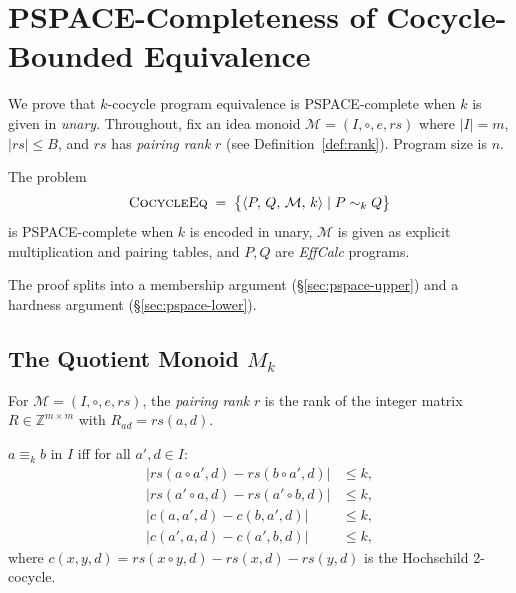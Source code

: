 
\section{PSPACE-Completeness of Cocycle-Bounded Equivalence}
\label{sec:pspace}

We prove that $k$-cocycle program equivalence is
\textsc{PSPACE}-complete when $k$ is given in \emph{unary}.
Throughout, fix an idea monoid $\mathcal{M}=(I,{\circ},e,\mathit{rs})$
where $|I|=m$, $|\mathit{rs}|\le B$, and $\mathit{rs}$ has
\emph{pairing rank} $r$ (see Definition~\ref{def:rank}).
Program size is $n$.

\begin{theorem}
\label{thm:pspace-main}
The problem
\[
  \textsc{CocycleEq} \;=\;
  \bigl\{\langle P,\,Q,\,\mathcal{M},\,k\rangle
        \mid P \sim_k Q\bigr\}
\]
is \textsc{PSPACE}-complete when $k$ is encoded in unary,
$\mathcal{M}$ is given as explicit multiplication and pairing tables,
and $P,Q$ are \emph{EffCalc} programs.
\end{theorem}

\noindent
The proof splits into a membership argument
(\S\ref{sec:pspace-upper}) and a hardness argument
(\S\ref{sec:pspace-lower}).

\subsection{The Quotient Monoid \texorpdfstring{$M_k$}{Mk}}
\label{sec:quotient}

\begin{definition}
\label{def:rank}
For $\mathcal{M}=(I,{\circ},e,\mathit{rs})$, the \emph{pairing rank}
$r$ is the rank of the integer matrix
$R \in \mathbb{Z}^{m\times m}$ with $R_{ad}=\mathit{rs}(a,d)$.
\end{definition}

\begin{definition}[$k$-indistinguishability]
\label{def:kindist}
$a \equiv_k b$ in $I$ iff for all $a',d\in I$:
\begin{align}
  |\mathit{rs}(a{\circ}a',d) - \mathit{rs}(b{\circ}a',d)| &\le k,
  \label{eq:c1}\\
  |\mathit{rs}(a'{\circ}a,d) - \mathit{rs}(a'{\circ}b,d)| &\le k,
  \label{eq:c2}\\
  |c(a,a',d) - c(b,a',d)| &\le k,
  \label{eq:c3}\\
  |c(a',a,d) - c(a',b,d)| &\le k,
  \label{eq:c4}
\end{align}
where $c(x,y,d)=\mathit{rs}(x{\circ}y,d)-\mathit{rs}(x,d)-\mathit{rs}(y,d)$
is the Hochschild 2-cocycle.
\end{definition}

